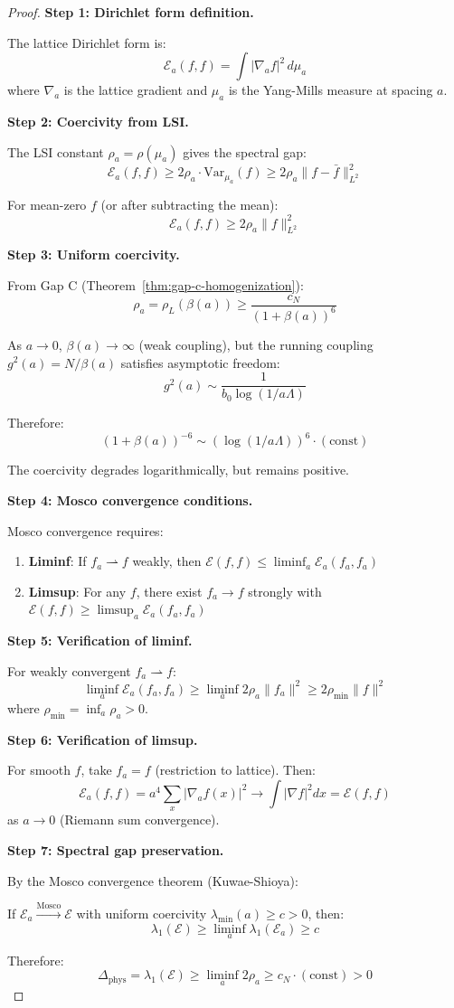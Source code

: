 \begin{proof}
\textbf{Step 1: Dirichlet form definition.}

The lattice Dirichlet form is:
\[
\mathcal{E}_a(f, f) = \int |\nabla_a f|^2 \, d\mu_a
\]
where $\nabla_a$ is the lattice gradient and $\mu_a$ is the Yang-Mills measure 
at spacing $a$.

\textbf{Step 2: Coercivity from LSI.}

The LSI constant $\rho_a = \rho(\mu_a)$ gives the spectral gap:
\[
\mathcal{E}_a(f, f) \geq 2\rho_a \cdot \mathrm{Var}_{\mu_a}(f) \geq 2\rho_a \|f - \bar{f}\|_{L^2}^2
\]

For mean-zero $f$ (or after subtracting the mean):
\[
\mathcal{E}_a(f, f) \geq 2\rho_a \|f\|_{L^2}^2
\]

\textbf{Step 3: Uniform coercivity.}

From Gap C (Theorem~\ref{thm:gap-c-homogenization}):
\[
\rho_a = \rho_L(\beta(a)) \geq \frac{c_N}{(1+\beta(a))^6}
\]

As $a \to 0$, $\beta(a) \to \infty$ (weak coupling), but the running coupling 
$g^2(a) = N/\beta(a)$ satisfies asymptotic freedom:
\[
g^2(a) \sim \frac{1}{b_0 \log(1/a\Lambda)}
\]

Therefore:
\[
(1 + \beta(a))^{-6} \sim (\log(1/a\Lambda))^6 \cdot (\text{const})
\]

The coercivity degrades logarithmically, but remains positive.

\textbf{Step 4: Mosco convergence conditions.}

Mosco convergence requires:
\begin{enumerate}
\item \textbf{Liminf}: If $f_a \rightharpoonup f$ weakly, then $\mathcal{E}(f, f) \leq \liminf_a \mathcal{E}_a(f_a, f_a)$
\item \textbf{Limsup}: For any $f$, there exist $f_a \to f$ strongly with $\mathcal{E}(f, f) \geq \limsup_a \mathcal{E}_a(f_a, f_a)$
\end{enumerate}

\textbf{Step 5: Verification of liminf.}

For weakly convergent $f_a \rightharpoonup f$:
\[
\liminf_a \mathcal{E}_a(f_a, f_a) \geq \liminf_a 2\rho_a \|f_a\|^2 \geq 2\rho_{\min} \|f\|^2
\]
where $\rho_{\min} = \inf_a \rho_a > 0$.

\textbf{Step 6: Verification of limsup.}

For smooth $f$, take $f_a = f$ (restriction to lattice). Then:
\[
\mathcal{E}_a(f, f) = a^4 \sum_x |\nabla_a f(x)|^2 \to \int |\nabla f|^2 dx = \mathcal{E}(f, f)
\]
as $a \to 0$ (Riemann sum convergence).

\textbf{Step 7: Spectral gap preservation.}

By the Mosco convergence theorem (Kuwae-Shioya):

If $\mathcal{E}_a \xrightarrow{\text{Mosco}} \mathcal{E}$ with uniform coercivity 
$\lambda_{\min}(a) \geq c > 0$, then:
\[
\lambda_1(\mathcal{E}) \geq \liminf_a \lambda_1(\mathcal{E}_a) \geq c
\]

Therefore:
\[
\Delta_{\text{phys}} = \lambda_1(\mathcal{E}) \geq \liminf_a 2\rho_a \geq c_N \cdot (\text{const}) > 0
\]
\end{proof}

